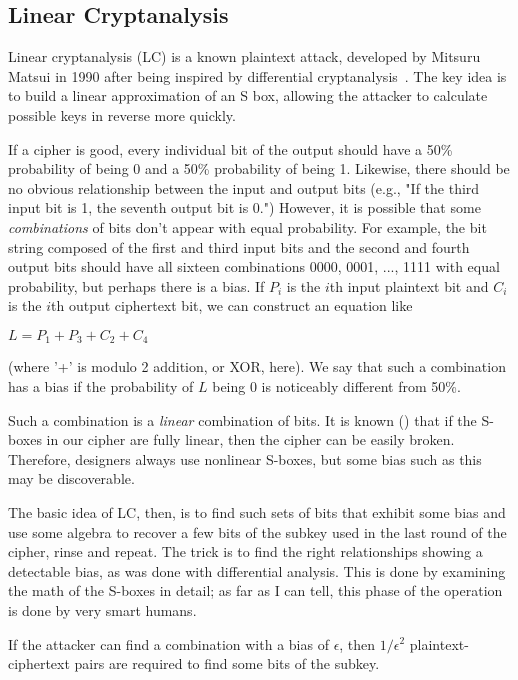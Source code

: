 \subsection{Linear Cryptanalysis}

Linear cryptanalysis (LC) is a known plaintext attack, developed by
Mitsuru Matsui in 1990 after being inspired by differential
cryptanalysis~\cite{matsui1993linear}.  The key idea is to build a
linear approximation of an S box, allowing the attacker to calculate
possible keys in reverse more quickly.

If a cipher is good, every individual bit of the output should have a
50\% probability of being 0 and a 50\% probability of being 1.
Likewise, there should be no obvious relationship between the input
and output bits (e.g., "If the third input bit is 1, the seventh
output bit is 0.")  However, it is possible that some \emph{combinations}
of bits don't appear with equal probability. For example, the bit
string composed of the first and third input bits and the second and
fourth output bits should have all sixteen combinations 0000, 0001,
..., 1111 with equal probability, but perhaps there is a bias.  If $P_i$
is the $i$th input plaintext bit and $C_i$ is the $i$th output ciphertext
bit, we can construct an equation like

$L = P_1 + P_3 + C_2 + C_4$

(where '+' is modulo 2 addition, or XOR, here).  We say that such a
combination has a bias if the probability of $L$ being 0 is noticeably
different from 50\%.

Such a combination is a \emph{linear} combination of bits.  It is known () that if the S-boxes in our cipher are fully linear, then the
cipher can be easily broken.  Therefore, designers always use
nonlinear S-boxes, but some bias such as this may be discoverable.

The basic idea of LC, then, is to find such sets of bits that exhibit
some bias and use some algebra to recover a few bits of the subkey
used in the last round of the cipher, rinse and repeat.  The trick is
to find the right relationships showing a detectable bias, as was done
with differential analysis.  This is done by examining the math of the
S-boxes in detail; as far as I can tell, this phase of the operation
is done by very smart humans. \aono{}

If the attacker can find a combination with a bias of $\epsilon$, then
$1/\epsilon^2$ plaintext-ciphertext pairs are required to find some bits
of the subkey.

